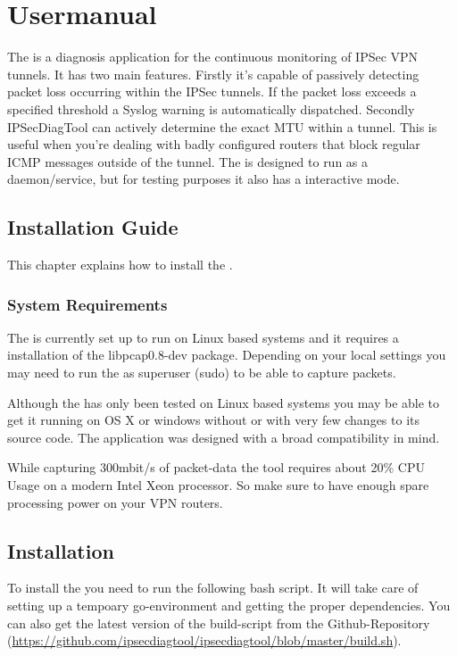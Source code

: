 \chapter{Usermanual}
\label{chap:Usermanual}
The \tool is a diagnosis application for the continuous monitoring of \acs{IPSec} \acs{VPN} tunnels. It has two main features. Firstly it's capable of passively detecting packet loss occurring within the \acs{IPSec} tunnels. If the packet loss exceeds a specified threshold a Syslog warning is automatically dispatched. Secondly IPSecDiagTool can actively determine the exact \acs{MTU} within a tunnel. This is useful when you're dealing with badly configured routers that block regular \acs{ICMP} messages outside of the tunnel. The \tool is designed to run as a daemon/service, but for testing purposes it also has a interactive mode.

\section{Installation Guide}
This chapter explains how to install the \tool.

\subsection{System Requirements}
The \tool is currently set up to run on Linux based systems and it requires a installation of the libpcap0.8-dev package. Depending on your local settings you may need to run the \tool as superuser (sudo) to be able to capture packets.

Although the \tool has only been tested on Linux based systems you may be able to get it running on OS X or windows without or with very few changes to its source code. The application was designed with a broad compatibility in mind.

While capturing 300mbit/s of packet-data the tool requires about 20\% CPU Usage on a modern Intel Xeon processor. So make sure to have enough spare processing power on your VPN routers.


\section{Installation}
To install the \tool you need to run the following bash script. It will take care of setting up a tempoary go-environment and getting the proper dependencies. You can also get the latest version of the build-script from the Github-Repository (\url{https://github.com/ipsecdiagtool/ipsecdiagtool/blob/master/build.sh}).

